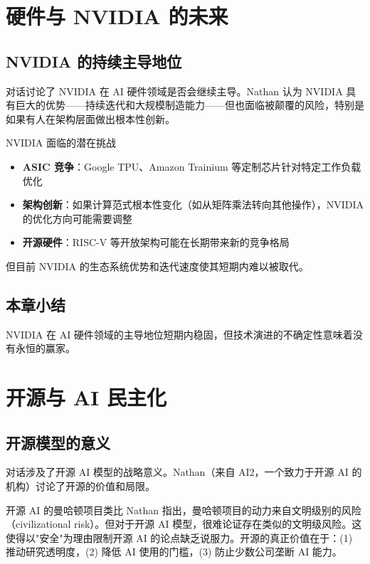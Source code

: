 \documentclass[a4paper]{article}
\begin{document}
\section{硬件与 NVIDIA 的未来}

\subsection{NVIDIA 的持续主导地位}

对话讨论了 NVIDIA 在 AI 硬件领域是否会继续主导。Nathan 认为 NVIDIA 具有巨大的优势——持续迭代和大规模制造能力——但也面临被颠覆的风险，特别是如果有人在架构层面做出根本性创新。

\begin{knowledgebox}{NVIDIA 面临的潜在挑战}
\begin{itemize}
    \item \textbf{ASIC 竞争}：Google TPU、Amazon Trainium 等定制芯片针对特定工作负载优化
    \item \textbf{架构创新}：如果计算范式根本性变化（如从矩阵乘法转向其他操作），NVIDIA 的优化方向可能需要调整
    \item \textbf{开源硬件}：RISC-V 等开放架构可能在长期带来新的竞争格局
\end{itemize}
但目前 NVIDIA 的生态系统优势和迭代速度使其短期内难以被取代。
\end{knowledgebox}

\subsection{本章小结}

NVIDIA 在 AI 硬件领域的主导地位短期内稳固，但技术演进的不确定性意味着没有永恒的赢家。

\section{开源与 AI 民主化}

\subsection{开源模型的意义}

对话涉及了开源 AI 模型的战略意义。Nathan（来自 AI2，一个致力于开源 AI 的机构）讨论了开源的价值和局限。

\begin{warningbox}{开源 AI 的曼哈顿项目类比}
Nathan 指出，曼哈顿项目的动力来自文明级别的风险（civilizational risk）。但对于开源 AI 模型，很难论证存在类似的文明级风险。这使得以"安全"为理由限制开源 AI 的论点缺乏说服力。开源的真正价值在于：(1) 推动研究透明度，(2) 降低 AI 使用的门槛，(3) 防止少数公司垄断 AI 能力。
\end{warningbox}
\end{document}

